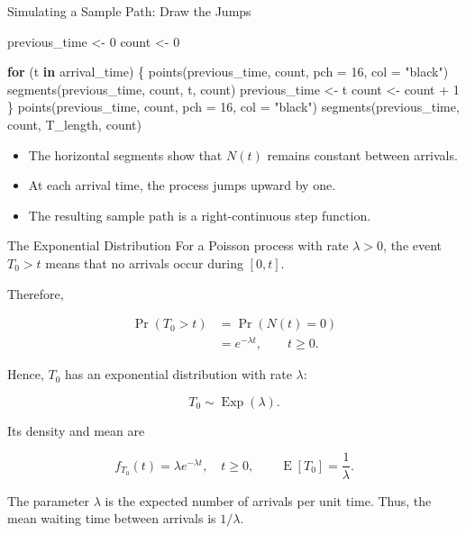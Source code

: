 \documentclass[
  ignorenonframetext,
  aspectratio=169,
]{beamer}
\newenvironment{Shaded}{\begin{snugshade}}{\end{snugshade}}
\newcommand{\AttributeTok}[1]{\textcolor[rgb]{0.40,0.45,0.13}{#1}}
\newcommand{\ControlFlowTok}[1]{\textcolor[rgb]{0.00,0.23,0.31}{\textbf{#1}}}
\newcommand{\DecValTok}[1]{\textcolor[rgb]{0.68,0.00,0.00}{#1}}
\newcommand{\FunctionTok}[1]{\textcolor[rgb]{0.28,0.35,0.67}{#1}}
\newcommand{\NormalTok}[1]{\textcolor[rgb]{0.00,0.23,0.31}{#1}}
\newcommand{\OtherTok}[1]{\textcolor[rgb]{0.00,0.23,0.31}{#1}}
\newcommand{\SpecialCharTok}[1]{\textcolor[rgb]{0.37,0.37,0.37}{#1}}
\newcommand{\StringTok}[1]{\textcolor[rgb]{0.13,0.47,0.30}{#1}}
\providecommand{\tightlist}{%
  \setlength{\itemsep}{0pt}\setlength{\parskip}{0pt}}
\begin{document}
\begin{frame}[fragile]{Simulating a Sample Path: Draw the Jumps}
\protect{}\label{simulating-a-sample-path-draw-the-jumps}
\begin{Shaded}
\begin{Highlighting}[]
\NormalTok{previous\_time }\OtherTok{\textless{}{-}} \DecValTok{0}
\NormalTok{count }\OtherTok{\textless{}{-}} \DecValTok{0}

\ControlFlowTok{for}\NormalTok{ (t }\ControlFlowTok{in}\NormalTok{ arrival\_time) \{}
  \FunctionTok{points}\NormalTok{(previous\_time, count, }\AttributeTok{pch =} \DecValTok{16}\NormalTok{, }\AttributeTok{col =} \StringTok{"black"}\NormalTok{)}
  \FunctionTok{segments}\NormalTok{(previous\_time, count, t, count)}
\NormalTok{  previous\_time }\OtherTok{\textless{}{-}}\NormalTok{ t}
\NormalTok{  count }\OtherTok{\textless{}{-}}\NormalTok{ count }\SpecialCharTok{+} \DecValTok{1}
\NormalTok{\}}
\FunctionTok{points}\NormalTok{(previous\_time, count, }\AttributeTok{pch =} \DecValTok{16}\NormalTok{, }\AttributeTok{col =} \StringTok{"black"}\NormalTok{)}
\FunctionTok{segments}\NormalTok{(previous\_time, count, T\_length, count)}
\end{Highlighting}
\end{Shaded}

\begin{itemize}
\tightlist
\item
  The horizontal segments show that \(N(t)\) remains constant between
  arrivals.
\item
  At each arrival time, the process jumps upward by one.
\item
  The resulting sample path is a right-continuous step function.
\end{itemize}
\end{frame}

\begin{frame}{The Exponential Distribution}
\protect{}\label{the-exponential-distribution}
For a Poisson process with rate \(\lambda>0\), the event \(T_0>t\) means
that no arrivals occur during \([0,t]\).

Therefore,

\[
\begin{aligned}
\Pr(T_0>t)
&=\Pr(N(t)=0)\\
&=e^{-\lambda t},\qquad t\geq 0.
\end{aligned}
\]

Hence, \(T_0\) has an exponential distribution with rate \(\lambda\):

\[
T_0\sim\operatorname{Exp}(\lambda).
\]

Its density and mean are

\[
f_{T_0}(t)=\lambda e^{-\lambda t},
\quad t\geq 0,
\qquad
\operatorname{E}[T_0]=\frac{1}{\lambda}.
\]

The parameter \(\lambda\) is the expected number of arrivals per unit
time. Thus, the mean waiting time between arrivals is \(1/\lambda\).
\end{frame}
\end{document}

